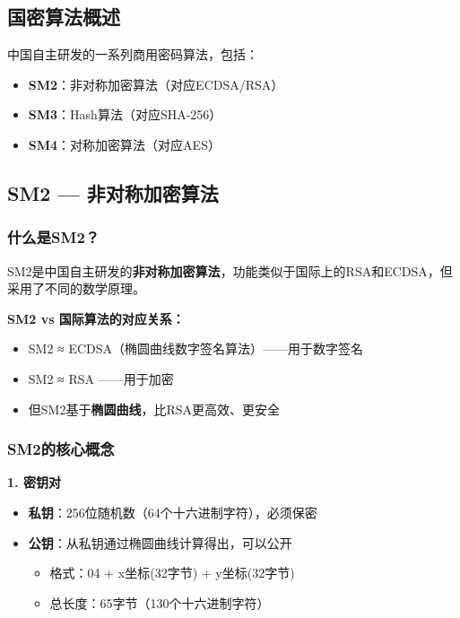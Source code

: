 ﻿\documentclass[12pt,a4paper]{article}
\begin{document}
\subsection{国密算法概述}

中国自主研发的一系列商用密码算法，包括：
\begin{itemize}[leftmargin=1.5em]
\item \textbf{SM2}：非对称加密算法（对应ECDSA/RSA）
\item \textbf{SM3}：Hash算法（对应SHA-256）
\item \textbf{SM4}：对称加密算法（对应AES）
\end{itemize}

\subsection{SM2 — 非对称加密算法}

\subsubsection{什么是SM2？}

SM2是中国自主研发的\textbf{非对称加密算法}，功能类似于国际上的RSA和ECDSA，但采用了不同的数学原理。

\begin{theorybox}
\textbf{SM2 vs 国际算法的对应关系：}
\begin{itemize}
\item SM2 ≈ ECDSA（椭圆曲线数字签名算法）——用于数字签名
\item SM2 ≈ RSA ——用于加密
\item 但SM2基于\textbf{椭圆曲线}，比RSA更高效、更安全
\end{itemize}
\end{theorybox}

\subsubsection{SM2的核心概念}

\textbf{1. 密钥对}
\begin{itemize}[leftmargin=1.5em]
\item \textbf{私钥}：256位随机数（64个十六进制字符），必须保密
\item \textbf{公钥}：从私钥通过椭圆曲线计算得出，可以公开
  \begin{itemize}
  \item 格式：04 + x坐标(32字节) + y坐标(32字节)
  \item 总长度：65字节（130个十六进制字符）
  \end{itemize}
\end{itemize}
\end{document}
